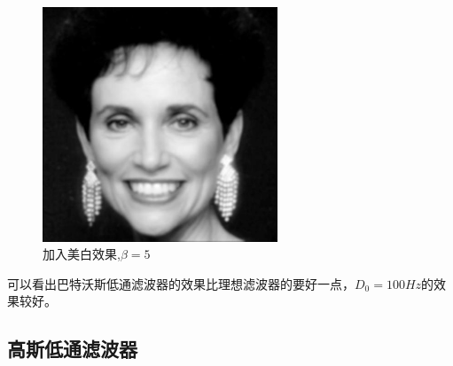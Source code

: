 \documentclass[11pt, a4paper, UTF8]{ctexart}
\begin{document}
\begin{figure}[H]
\begin{minipage}[t]{0.48\textwidth}
        \caption{$D_0 =100Hz,N=2$}
        \end{minipage}
      \begin{minipage}[t]{0.48\textwidth}
        \centering
        \includegraphics[width=7cm]{Bw_log.jpg}
        \caption{加入美白效果,$\beta=5$}
        \end{minipage}
    \end{figure}
    可以看出巴特沃斯低通滤波器的效果比理想滤波器的要好一点，$D_0 =100Hz$的效果较好。


    \subsection{高斯低通滤波器}
\end{document}
